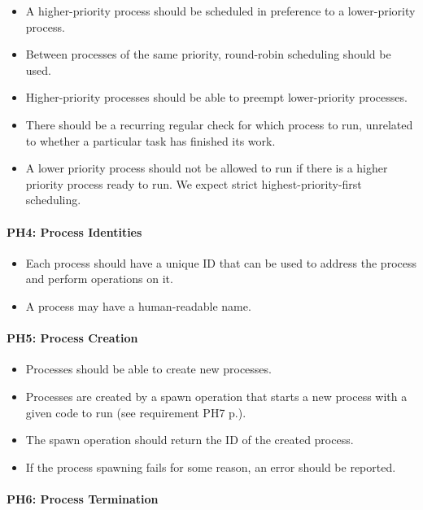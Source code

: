 \begin{itemize}
  \item  A higher-priority process should be scheduled in preference to a lower-priority process.
  \item  Between processes of the same priority, round-robin scheduling should be used.
  \item  Higher-priority processes should be able to preempt lower-priority processes.
  \item  There should be a recurring regular check for which process to run, unrelated to whether a particular task has finished its work.
  \item  A lower priority process should not be allowed to run if there is a higher priority process ready to run. We expect strict highest-priority-first scheduling.
\end{itemize}

\paragraph{PH4: Process Identities}
\label{pg:ph4}

\begin{itemize}
  \item Each process should have a unique ID that can be used to address the process and perform operations on it.
  \item  A process may have a human-readable name.
\end{itemize}

\paragraph{PH5: Process Creation}
\label{pg:ph5}

\begin{itemize}
  \item Processes should be able to create new processes.
  \item  Processes are created by a spawn operation that starts a new process with a given code to run (see requirement PH7 p.\pageref{pg:ph7}).
  \item  The spawn operation should return the ID of the created process.
  \item  If the process spawning fails for some reason, an error should be reported.
\end{itemize}

\paragraph{PH6: Process Termination}
\label{pg:ph6}


